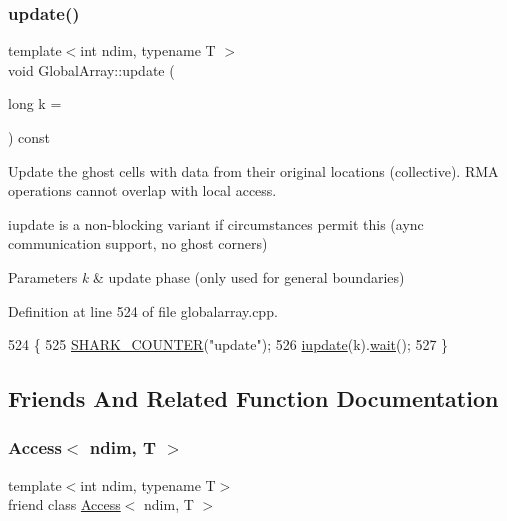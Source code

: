\subsubsection{\texorpdfstring{update()}{update()}}
{\footnotesize\ttfamily template$<$int ndim, typename T $>$ \\
void Global\+Array\+::update (\begin{DoxyParamCaption}\item[{long}]{k = {} }\end{DoxyParamCaption}) const}





 

Update the ghost cells with data from their original locations (collective). R\+MA operations cannot overlap with local access.

iupdate is a non-\/blocking variant if circumstances permit this (aync communication support, no ghost corners)


\begin{DoxyParams}{Parameters}
{\em k} & update phase (only used for general boundaries) \\
\hline
\end{DoxyParams}


Definition at line 524 of file globalarray.\+cpp.


\begin{DoxyCode}
524                                              \{
525     \hyperlink{globals_8hpp_abbe2b020b65cc72852ccd88c8cb2f4bb}{SHARK\_COUNTER}(\textcolor{stringliteral}{"update"});
526     \hyperlink{classshark_1_1ndim_1_1_global_array_a6485a70dbb541c3bc600fb96903169ef}{iupdate}(k).\hyperlink{structshark_1_1_future_3_01void_01_4_ab44321f72b9e3c40b622d612a772156c}{wait}();
527 \}
\end{DoxyCode}


\subsection{Friends And Related Function Documentation}
\hypertarget{classshark_1_1ndim_1_1_global_array_aa496c51f4f4225904ad62cb63601e053}{}\label{classshark_1_1ndim_1_1_global_array_aa496c51f4f4225904ad62cb63601e053} 
\subsubsection{\texorpdfstring{Access$<$ ndim, T $>$}{Access< ndim, T >}}
{\footnotesize\ttfamily template$<$int ndim, typename T$>$ \\
friend class \hyperlink{classshark_1_1ndim_1_1_access}{Access}$<$ ndim, T $>$\hspace{0.3cm}{\ttfamily [friend]}}



